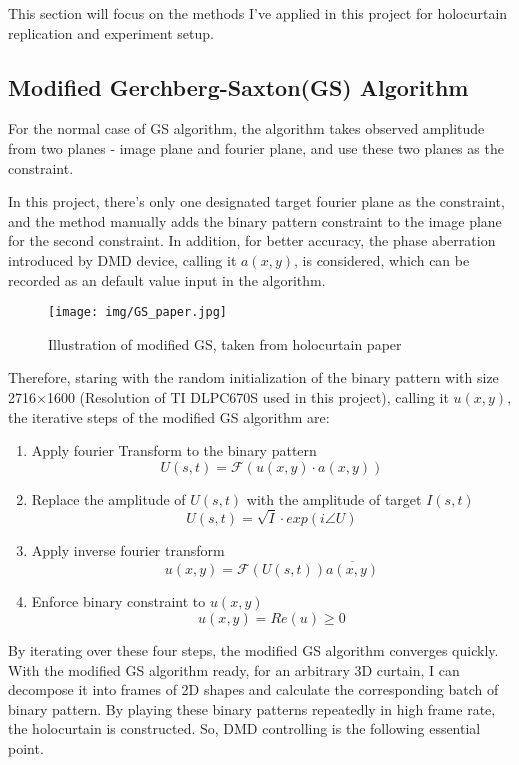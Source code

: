 \documentclass[10pt,journal,compsoc]{IEEEtran}
\begin{document}
This section will focus on the methods I've applied in this project for holocurtain replication and experiment setup.

\subsection{Modified Gerchberg-Saxton(GS) Algorithm}
\label{sec:3.1}

For the normal case of GS algorithm, the algorithm takes observed amplitude from two planes - image plane and fourier plane, and use these two planes as the constraint. 

In this project, there's only one designated target fourier plane as the constraint, and the method manually adds the binary pattern constraint to the image plane for the second constraint. In addition, for better accuracy, the phase aberration introduced by DMD device, calling it $a(x, y)$, is considered, which can be recorded as an default value input in the algorithm.

\begin{figure}[!h]
    \centering
    \texttt{[image: img/GS\_paper.jpg]}
    \caption{Illustration of modified GS, taken from holocurtain paper\cite{holocurtain}}
    \label{fig:fig7}
\end{figure}

Therefore, staring with the random initialization of the binary pattern with size 2716$\times$1600 (Resolution of TI DLPC670S used in this project), calling it $u(x, y)$, the iterative steps of the modified GS algorithm are:
\begin{enumerate}
    \item Apply fourier Transform to the binary pattern
    $$U(s, t) = \mathcal{F}(u(x, y) \cdot a(x, y))$$
    \item Replace the amplitude of $U(s, t)$ with the amplitude of target $I(s, t)$ $$U(s, t) = \sqrt{I}\cdot exp(i\angle U)$$
    \item Apply inverse fourier transform 
    $$u(x, y) = \mathcal{F}(U(s, t))\overline{a(x, y)}$$
    \item Enforce binary constraint to $u(x, y)$
    $$u(x, y) = Re(u) \geq 0$$
\end{enumerate}

By iterating over these four steps, the modified GS algorithm converges quickly. With the modified GS algorithm ready, for an arbitrary 3D curtain, I can decompose it into frames of 2D shapes and calculate the corresponding batch of binary pattern. By playing these binary patterns repeatedly in high frame rate, the holocurtain is constructed. So, DMD controlling is the following essential point.
\end{document}
